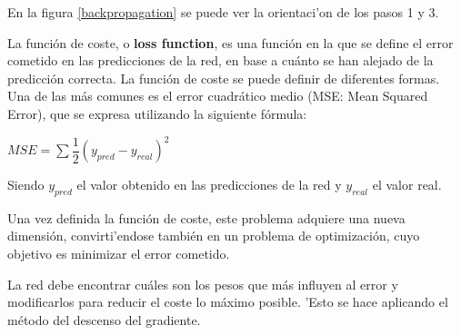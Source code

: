 En la figura \ref{backpropagation} se puede ver la orientaci'on de los pasos 1 y 3.

La función de coste, o \textbf{loss function}, es una función en la que se define el error cometido en las predicciones de la red, en base a cuánto se han alejado de la predicción correcta. La función de coste se puede definir de diferentes formas. Una de las más
comunes es el error cuadrático medio (MSE: Mean Squared Error), que se expresa utilizando la siguiente fórmula: 

\begin{center}
$ MSE = \sum  \dfrac{1}{2}(y_{pred} - y_{real})^{2}$
\end{center}

Siendo $ y_{pred} $  el valor obtenido en las predicciones de la red y $ y_{real} $  el valor real.

Una vez definida la función de coste, este problema adquiere una nueva dimensión, convirti'endose también en un problema de optimización, cuyo objetivo es minimizar el error cometido. 

La red debe encontrar cuáles son los pesos que más influyen al error y modificarlos para reducir el coste lo máximo posible. 'Esto se hace aplicando el método del descenso del gradiente.

\clearpage
